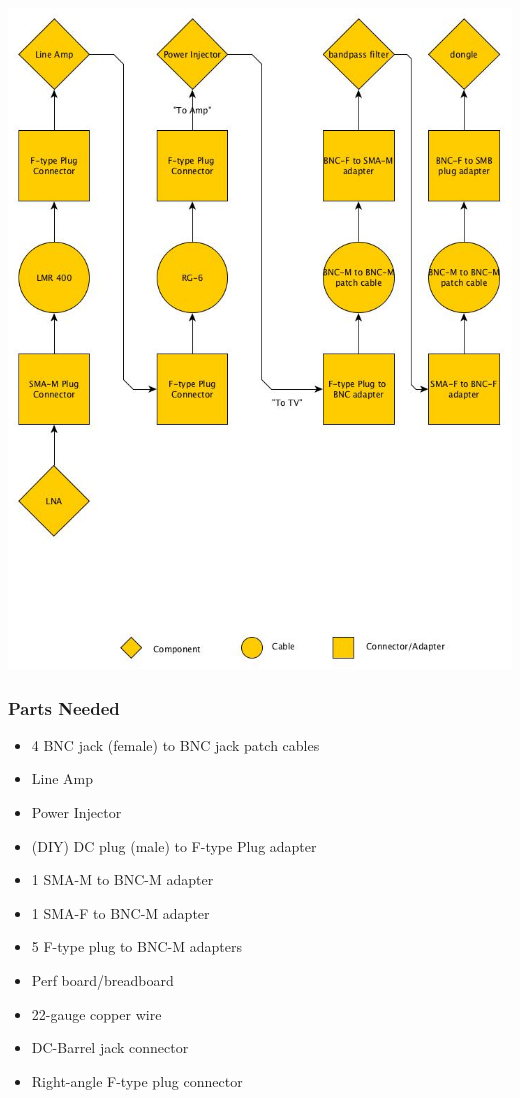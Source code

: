 \documentclass[11pt]{article} %
\begin{document}
\begin{center}
\includegraphics[scale=0.35]{lnainterface/01.jpeg}
\end{center}


\subsubsection{Parts Needed}
\begin{multicols}{2}
\begin{itemize}
\item 4 BNC jack (female) to BNC jack patch cables
\item Line Amp
\item Power Injector
\item (DIY) DC plug (male) to F-type Plug adapter
\item 1 SMA-M to BNC-M adapter
\item 1 SMA-F to BNC-M adapter
\item 5 F-type plug to BNC-M adapters
\item Perf board/breadboard
\item 22-gauge copper wire
\item DC-Barrel jack connector
\item Right-angle F-type plug connector
\end{itemize}
\end{multicols}
\end{document}
